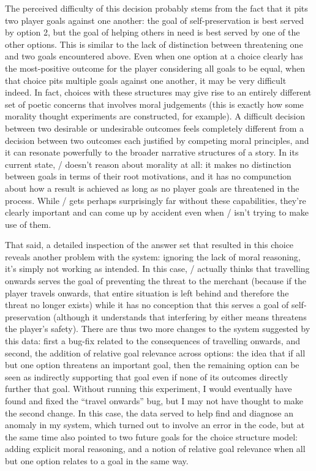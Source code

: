 The perceived difficulty of this decision probably stems from the fact that it pits two player goals against one another: the goal of self-preservation is best served by option 2, but the goal of helping others in need is best served by one of the other options.
%
This is similar to the lack of distinction between threatening one and two goals encountered above.
%
Even when one option at a choice clearly has the most-positive outcome for the player considering all goals to be equal, when that choice pits multiple goals against one another, it may be very difficult indeed.
%
In fact, choices with these structures may give rise to an entirely different set of poetic concerns that involves moral judgements (this is exactly how some morality thought experiments are constructed, for example).
%
A difficult decision between two desirable or undesirable outcomes feels completely different from a decision between two outcomes each justified by competing moral principles, and it can resonate powerfully to the broader narrative structures of a story.
%
In its current state, \dunyazad/ doesn't reason about morality at all: it makes no distinction between goals in terms of their root motivations, and it has no compunction about how a result is achieved as long as no player goals are threatened in the process.
%
While \dunyazad/ gets perhaps surprisingly far without these capabilities, they're clearly important and can come up by accident even when \dunyazad/ isn't trying to make use of them.


That said, a detailed inspection of the answer set that resulted in this choice reveals another problem with the system: ignoring the lack of moral reasoning, it's simply not working as intended.
%
In this case, \dunyazad/ actually thinks that travelling onwards serves the goal of preventing the threat to the merchant (because if the player travels onwards, that entire situation is left behind and therefore the threat no longer exists) while it has no conception that this serves a goal of self-preservation (although it understands that interfering by either means threatens the player's safety).
%
There are thus two more changes to the system suggested by this data: first a bug-fix related to the consequences of travelling onwards, and second, the addition of relative goal relevance across options: the idea that if all but one option threatens an important goal, then the remaining option can be seen as indirectly supporting that goal even if none of its outcomes directly further that goal.
%
Without running this experiment, I would eventually have found and fixed the ``travel onwards'' bug, but I may not have thought to make the second change.
%
In this case, the data served to help find and diagnose an anomaly in my system, which turned out to involve an error in the code, but at the same time also pointed to two future goals for the choice structure model: adding explicit moral reasoning, and a notion of relative goal relevance when all but one option relates to a goal in the same way.


